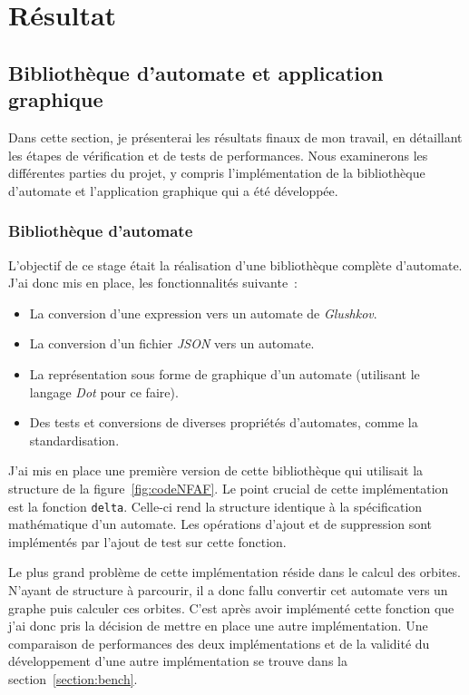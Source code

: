 \section{Résultat}

\subsection{Bibliothèque d'automate et application graphique}

Dans cette section, je présenterai les résultats finaux de mon travail, en
détaillant les étapes de vérification et de tests de performances. Nous
examinerons les différentes parties du projet, y compris l'implémentation de la    
bibliothèque d'automate et l'application graphique qui a été développée.

\subsubsection{Bibliothèque d'automate}

L'objectif de ce stage était la réalisation d'une bibliothèque complète
d'automate. J'ai donc mis en place, les fonctionnalités suivante~:
\begin{itemize}
    \item[\textbullet] La conversion d'une expression vers un automate de 
    \textit{Glushkov}.
    \item[\textbullet] La conversion d'un fichier \textit{JSON} vers un
    automate.
    \item[\textbullet] La représentation sous forme de graphique d'un automate 
    (utilisant le langage \textit{Dot} pour ce faire). 
    \item[\textbullet] Des tests et conversions de diverses propriétés
    d'automates, comme la standardisation.
\end{itemize} 

\vphantom{}

J'ai mis en place une première version de cette bibliothèque qui utilisait la
structure de la figure~\ref{fig:codeNFAF}. Le point crucial de cette
implémentation est la fonction \texttt{delta}. Celle-ci rend la
structure identique à la spécification mathématique d'un automate. Les
opérations d'ajout et de suppression sont implémentés par l'ajout de test sur 
cette fonction.

\vphantom{}

Le plus grand problème de cette implémentation réside dans le calcul des
orbites. N'ayant de structure à parcourir, il a donc fallu convertir cet
automate vers un graphe puis calculer ces orbites. C'est après avoir implémenté
cette fonction que j'ai donc pris la décision de mettre en place une autre
implémentation. Une comparaison de performances des deux implémentations et de
la validité du développement d'une autre implémentation se trouve dans la
section~\ref{section:bench}.


